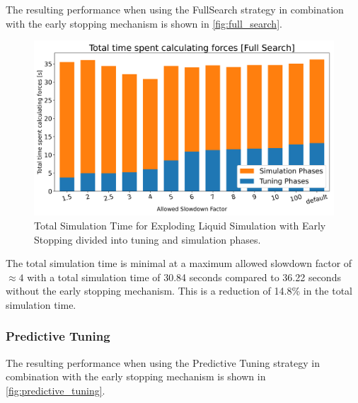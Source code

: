 \documentclass[conference]{IEEEtran}
\begin{document}
The resulting performance when using the FullSearch strategy in combination with the early stopping mechanism is shown in \autoref{fig:full_search}.

\begin{figure}[H]
    \centering

    \includegraphics[width=\columnwidth]{../data/explodingLiquid/cluster/fullSearch/analytics/total_time_average.png}

    \caption{Total Simulation Time for Exploding Liquid Simulation with Early Stopping divided into tuning and simulation phases.}
    \label{fig:full_search}
\end{figure}


The total simulation time is minimal at a maximum allowed slowdown factor of $\approx4$ with a total simulation time of 30.84 seconds compared to 36.22 seconds without the early stopping mechanism. This is a reduction of 14.8\% in the total simulation time.

\subsubsection{Predictive Tuning}

The resulting performance when using the Predictive Tuning strategy in combination with the early stopping mechanism is shown in \autoref{fig:predictive_tuning}.
\end{document}
